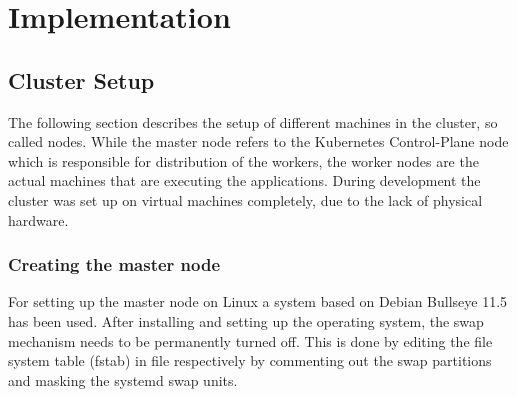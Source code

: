 \chapter{Implementation} %

\label{chap:implementation} %




\section{Cluster Setup}
The following section describes the setup of different machines in the cluster, so called nodes. While the master node refers to the Kubernetes Control-Plane node which is responsible for distribution of the workers, the worker nodes are the actual machines that are executing the applications. During development the cluster was set up on virtual machines completely, due to the lack of physical hardware.


\subsection{Creating the master node}
For setting up the master node on Linux a system based on Debian Bullseye 11.5 has been used. After installing and setting up the operating system, the swap mechanism needs to be permanently turned off. This is done by editing the file system table (fstab) in file  respectively by commenting out the swap partitions and masking the systemd swap units.



%


